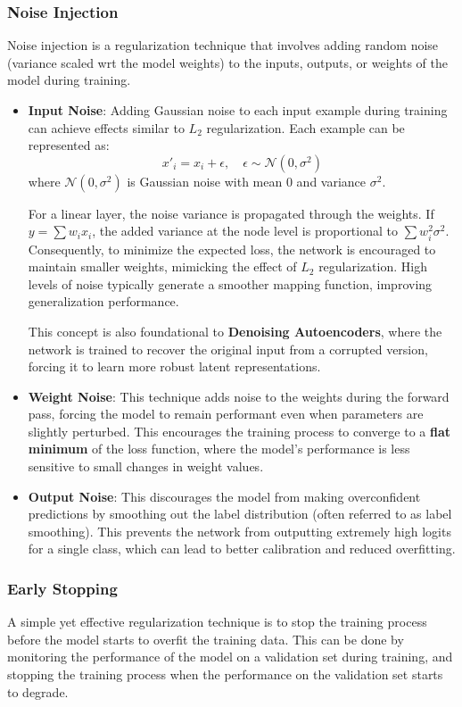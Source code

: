 \subsubsection{Noise Injection}
Noise injection is a regularization technique that involves adding random noise (variance scaled wrt the model weights) 
to the inputs, outputs, or weights of the model during training.
\begin{itemize}
    \item \textbf{Input Noise}: Adding Gaussian noise to each input example during training can achieve effects similar to $L_2$ regularization. 
    Each example can be represented as:
    \[ x'_i = x_i + \epsilon, \quad \epsilon \sim \mathcal{N}(0, \sigma^2) \]
    where $\mathcal{N}(0, \sigma^2)$ is Gaussian noise with mean 0 and variance $\sigma^2$. 

    For a linear layer, the noise variance is propagated through the weights. 
    If $y = \sum w_i x_i$, the added variance at the node level is proportional to $\sum w_i^2 \sigma^2$. 
    Consequently, to minimize the expected loss, the network is encouraged to maintain smaller weights, mimicking the effect of $L_2$ regularization. 
    High levels of noise typically generate a smoother mapping function, improving generalization performance.

    This concept is also foundational to \textbf{Denoising Autoencoders}, where the network is trained to recover the original input 
    from a corrupted version, forcing it to learn more robust latent representations.

    \item \textbf{Weight Noise}: This technique adds noise to the weights during the forward pass, 
    forcing the model to remain performant even when parameters are slightly perturbed. 
    This encourages the training process to converge to a \textbf{flat minimum} of the loss function, 
    where the model's performance is less sensitive to small changes in weight values.

    \item \textbf{Output Noise}: This discourages the model from making overconfident predictions by smoothing out the label distribution (often referred to as label smoothing). 
    This prevents the network from outputting extremely high logits for a single class, which can lead to better calibration and reduced overfitting.
\end{itemize}

\subsubsection{Early Stopping}
A simple yet effective regularization technique is to stop the training process before the model starts to overfit the training data.
This can be done by monitoring the performance of the model on a validation set during training, and stopping the training process when the 
performance on the validation set starts to degrade.

